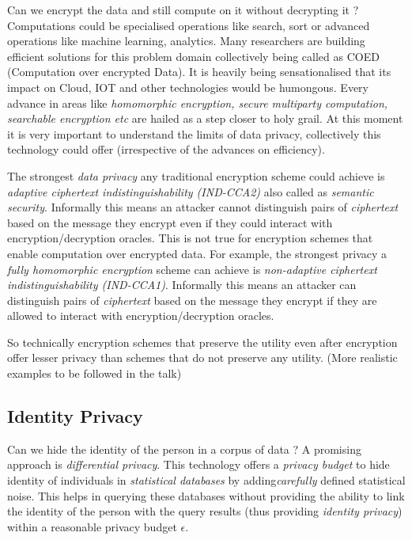 \documentclass[11pt, oneside]{article}   	%
\numberwithin{equation}{section}
\begin{document}
Can we encrypt the data and still compute on it without decrypting it ? Computations could be specialised operations like search, sort or advanced operations like machine learning, analytics. Many researchers are building efficient solutions for this problem domain collectively being called as COED (Computation over encrypted Data). It is heavily being sensationalised that its impact on Cloud, IOT and other technologies would be humongous. Every advance in areas like \emph{ homomorphic encryption, secure multiparty computation, searchable encryption etc} are hailed as a step closer to holy grail. At this moment it is very important to understand the limits of data privacy, collectively this technology could offer (irrespective of the advances on efficiency). 

The strongest \emph{data privacy} any traditional encryption scheme could achieve is \emph{adaptive ciphertext indistinguishability (IND-CCA2)}  also called as \emph{semantic security}. Informally this means an attacker cannot distinguish pairs of \emph{ciphertext} based on the message they encrypt even if they could interact with encryption/decryption oracles. This is not true for encryption schemes that enable computation over encrypted data. For example, the strongest privacy a \emph{fully homomorphic encryption} scheme can achieve is \emph{non-adaptive ciphertext indistinguishability (IND-CCA1)}. Informally this means an attacker can distinguish pairs of \emph{ciphertext} based on the message they encrypt if they are allowed to interact with encryption/decryption oracles. 

So technically encryption schemes that preserve the utility even after encryption offer lesser privacy than schemes that do not preserve any utility. (More realistic examples to be followed in the talk)


\subsection{Identity Privacy}
Can we hide the identity of the person in a corpus of data ? A promising approach is \emph{differential privacy}. 
This technology offers a \emph{privacy budget} to hide identity of individuals in \emph{statistical databases} by adding\emph{carefully} defined statistical noise. This helps in querying these databases without providing the ability to link the identity of the person with the query results (thus providing \emph{identity privacy}) within a reasonable privacy budget $\epsilon$.
\end{document}
